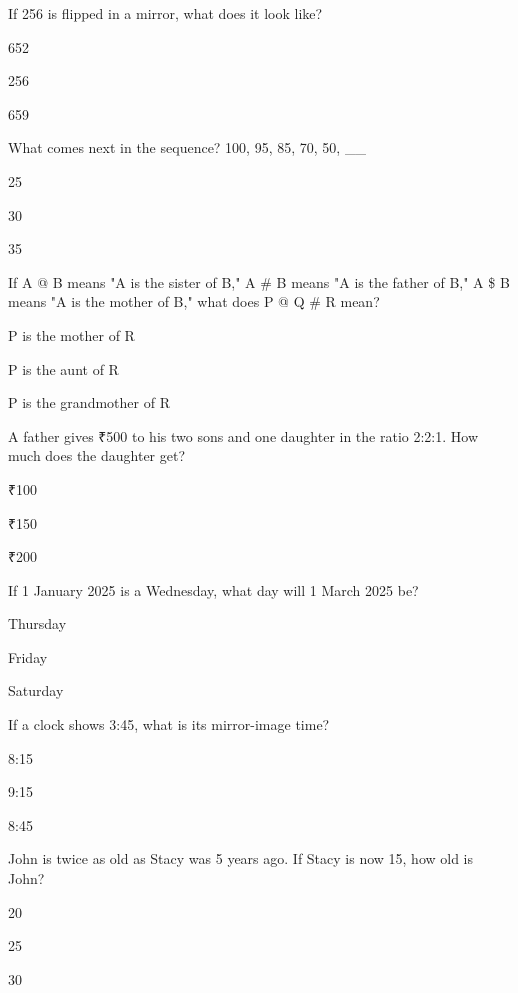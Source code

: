 \begin{enhancedmcq}{If 256 is flipped in a mirror, what does it look like?}
\item 652
\item 256
\item 659

\end{enhancedmcq}
\begin{enhancedmcq}{What comes next in the sequence? 100, 95, 85, 70, 50, __}
\item 25
\item 30
\item 35

\end{enhancedmcq}
\begin{enhancedmcq}{If A @ B means "A is the sister of B," A # B means "A is the father of B," A \$ B means "A is the mother of B," what does P @ Q # R mean?}
\item P is the mother of R
\item P is the aunt of R
\item P is the grandmother of R

\end{enhancedmcq}
\begin{enhancedmcq}{A father gives ₹500 to his two sons and one daughter in the ratio 2:2:1. How much does the daughter get?}
\item ₹100
\item ₹150
\item ₹200

\end{enhancedmcq}
\begin{enhancedmcq}{If 1 January 2025 is a Wednesday, what day will 1 March 2025 be?}
\item Thursday
\item Friday
\item Saturday

\end{enhancedmcq}
\begin{enhancedmcq}{If a clock shows 3:45, what is its mirror-image time?}
\item 8:15
\item 9:15
\item 8:45

\end{enhancedmcq}
\begin{enhancedmcq}{John is twice as old as Stacy was 5 years ago. If Stacy is now 15, how old is John?}
\item 20
\item 25
\item 30

\end{enhancedmcq}
